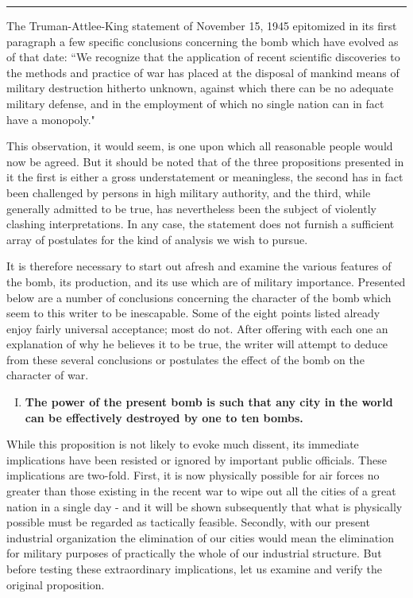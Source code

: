 \noindent\hfil\rule{0.4\textwidth}{.4pt}\hfil

\vspace{4pt}

The Truman-Attlee-King statement of November 15, 1945 epitomized in its first paragraph a few specific conclusions concerning the bomb which have evolved as of that date: ``We recognize that the application of recent scientific discoveries to the methods and practice of war has placed at the disposal of mankind means of military destruction hitherto unknown, against which there can be no adequate military defense, and in the employment of which no single nation can in fact have a monopoly."

This observation, it would seem, is one upon which all reasonable people would now be agreed. But it should be noted that of the three propositions presented in it the first is either a gross understatement or meaningless, the second has in fact been challenged by persons in high military authority, and the third, while generally admitted to be true, has nevertheless been the subject of violently clashing interpretations. In any case, the statement does not furnish a sufficient array of postulates for the kind of analysis we wish to pursue.

It is therefore necessary to start out afresh and examine the various features of the bomb, its production, and its use which are of military importance. Presented below are a number of conclusions concerning the character of the bomb which seem to this writer to be inescapable. Some of the eight points listed already enjoy fairly universal acceptance; most do not. After offering with each one an explanation of why he believes it to be true, the writer will attempt to deduce from these several conclusions or postulates the effect of the bomb on the character of war.

\begin{enumerate}[I.]

\item \textbf{The power of the present bomb is such that any city in the world can be effectively destroyed by one to ten bombs.}

\end{enumerate}

While this proposition is not likely to evoke much dissent, its immediate implications have been resisted or ignored by important public officials. These implications are two-fold. First, it is now physically possible for air forces no greater than those existing in the recent war to wipe out all the cities of a great nation in a single day - and it will be shown subsequently that what is physically possible must be regarded as tactically feasible. Secondly, with our present industrial organization the elimination of our cities would mean the elimination for military purposes of practically the whole of our industrial structure. But before testing these extraordinary implications, let us examine and verify the original proposition.

